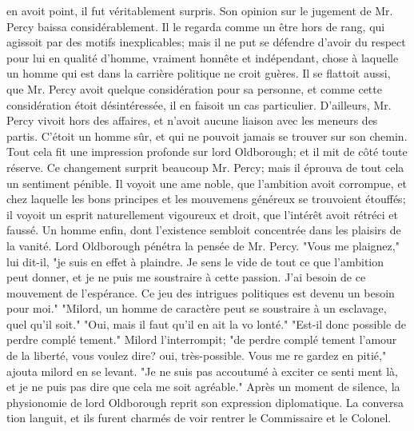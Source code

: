 en avoit point, il fut véritablement surpris. Son opinion sur le jugement de Mr. Percy baissa considérablement. Il le regarda comme un être hors de rang, qui agissoit par des motifs inexplicables; mais il ne put se défendre d'avoir du respect pour lui en qualité d'homme, vraiment honnête et indépendant,\setcounter{page}{517} chose à laquelle un homme qui est dans la carrière politique ne croit guères. Il se flattoit aussi, que Mr. Percy avoit quelque considération pour sa personne, et comme cette considération étoit désintéressée, il en faisoit un cas particulier. D'ailleurs, Mr. Percy vivoit hors des affaires, et n'avoit aucune liaison avec les meneurs des partis. C'étoit un homme sûr, et qui ne pouvoit jamais se trouver sur son chemin. Tout cela fit une impression profonde sur lord Oldborough; et il mit de côté toute réserve. Ce changement surprit beaucoup Mr. Percy; mais il éprouva de tout cela un sentiment pénible. Il voyoit une ame noble, que l'ambition avoit corrompue, et chez laquelle les bons principes et les mouvemens généreux se trouvoient étouffés; il voyoit un esprit naturellement vigoureux et droit, que l'intérêt avoit rétréci et faussé. Un homme enfin, dont l'existence sembloit concentrée dans les plaisirs de la vanité. Lord Oldborough pénétra la pensée de Mr. Percy. "Vous me plaignez," lui dit-il, "je suis en effet à plaindre. Je sens le vide de tout ce que l'ambition peut donner, et je ne puis me soustraire à cette passion. J'ai besoin de ce mouvement de l'espérance. Ce jeu des intrigues politiques est devenu un besoin pour moi."\setcounter{page}{518} "Milord, un homme de caractère peut
se soustraire à un esclavage, quel qu'il soit."
"Oui, mais il faut qu'il en ait la vo lonté."
"Est-il donc possible de perdre complé tement."
Milord l'interrompit; "de perdre complé tement l'amour de la liberté, vous voulez dire? oui, très-possible. Vous me re gardez en pitié," ajouta milord en se levant.
"Je ne suis pas accoutumé à exciter ce senti ment là, et je ne puis pas dire que cela me soit agréable."
Après un moment de silence, la physionomie de lord Oldborough reprit son expression diplomatique. La conversa tion languit, et ils furent charmés de voir rentrer le Commissaire et le Colonel.
